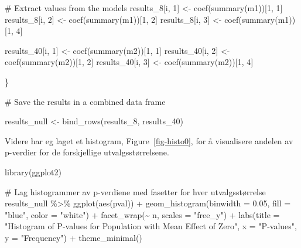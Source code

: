 \documentclass[
  letterpaper,
  DIV=11,
  numbers=noendperiod]{scrreprt}
\newenvironment{Shaded}{\begin{snugshade}}{\end{snugshade}}
\newcommand{\AttributeTok}[1]{\textcolor[rgb]{0.40,0.45,0.13}{#1}}
\newcommand{\CommentTok}[1]{\textcolor[rgb]{0.37,0.37,0.37}{#1}}
\newcommand{\DecValTok}[1]{\textcolor[rgb]{0.68,0.00,0.00}{#1}}
\newcommand{\FloatTok}[1]{\textcolor[rgb]{0.68,0.00,0.00}{#1}}
\newcommand{\FunctionTok}[1]{\textcolor[rgb]{0.28,0.35,0.67}{#1}}
\newcommand{\NormalTok}[1]{\textcolor[rgb]{0.00,0.23,0.31}{#1}}
\newcommand{\OtherTok}[1]{\textcolor[rgb]{0.00,0.23,0.31}{#1}}
\newcommand{\SpecialCharTok}[1]{\textcolor[rgb]{0.37,0.37,0.37}{#1}}
\newcommand{\StringTok}[1]{\textcolor[rgb]{0.13,0.47,0.30}{#1}}
\begin{document}
\begin{Shaded}
\begin{Highlighting}[]
  \CommentTok{\# Extract values from the models}
\NormalTok{  results\_8[i, }\DecValTok{1}\NormalTok{] }\OtherTok{\textless{}{-}} \FunctionTok{coef}\NormalTok{(}\FunctionTok{summary}\NormalTok{(m1))[}\DecValTok{1}\NormalTok{, }\DecValTok{1}\NormalTok{]}
\NormalTok{  results\_8[i, }\DecValTok{2}\NormalTok{] }\OtherTok{\textless{}{-}} \FunctionTok{coef}\NormalTok{(}\FunctionTok{summary}\NormalTok{(m1))[}\DecValTok{1}\NormalTok{, }\DecValTok{2}\NormalTok{]}
\NormalTok{  results\_8[i, }\DecValTok{3}\NormalTok{] }\OtherTok{\textless{}{-}} \FunctionTok{coef}\NormalTok{(}\FunctionTok{summary}\NormalTok{(m1))[}\DecValTok{1}\NormalTok{, }\DecValTok{4}\NormalTok{]}

\NormalTok{  results\_40[i, }\DecValTok{1}\NormalTok{] }\OtherTok{\textless{}{-}} \FunctionTok{coef}\NormalTok{(}\FunctionTok{summary}\NormalTok{(m2))[}\DecValTok{1}\NormalTok{, }\DecValTok{1}\NormalTok{]}
\NormalTok{  results\_40[i, }\DecValTok{2}\NormalTok{] }\OtherTok{\textless{}{-}} \FunctionTok{coef}\NormalTok{(}\FunctionTok{summary}\NormalTok{(m2))[}\DecValTok{1}\NormalTok{, }\DecValTok{2}\NormalTok{]}
\NormalTok{  results\_40[i, }\DecValTok{3}\NormalTok{] }\OtherTok{\textless{}{-}} \FunctionTok{coef}\NormalTok{(}\FunctionTok{summary}\NormalTok{(m2))[}\DecValTok{1}\NormalTok{, }\DecValTok{4}\NormalTok{]}
  
  
\NormalTok{\}}


\CommentTok{\# Save the results in a combined data frame}

\NormalTok{results\_null }\OtherTok{\textless{}{-}} \FunctionTok{bind\_rows}\NormalTok{(results\_8, results\_40)}
\end{Highlighting}
\end{Shaded}

Videre har eg laget et histogram, Figure~\ref{fig-histo0}, for å
visualisere andelen av p-verdier for de forskjellige utvalgsstørrelsene.

\begin{Shaded}
\begin{Highlighting}[]
\FunctionTok{library}\NormalTok{(ggplot2)}

\CommentTok{\# Lag histogrammer av p{-}verdiene med fasetter for hver utvalgsstørrelse}
\NormalTok{results\_null }\SpecialCharTok{\%\textgreater{}\%}
  \FunctionTok{ggplot}\NormalTok{(}\FunctionTok{aes}\NormalTok{(pval)) }\SpecialCharTok{+} 
  \FunctionTok{geom\_histogram}\NormalTok{(}\AttributeTok{binwidth =} \FloatTok{0.05}\NormalTok{, }\AttributeTok{fill =} \StringTok{"blue"}\NormalTok{, }\AttributeTok{color =} \StringTok{"white"}\NormalTok{) }\SpecialCharTok{+} 
  \FunctionTok{facet\_wrap}\NormalTok{(}\SpecialCharTok{\textasciitilde{}}\NormalTok{ n, }\AttributeTok{scales =} \StringTok{"free\_y"}\NormalTok{) }\SpecialCharTok{+}
  \FunctionTok{labs}\NormalTok{(}\AttributeTok{title =} \StringTok{"Histogram of P{-}values for Population with Mean Effect of Zero"}\NormalTok{,}
       \AttributeTok{x =} \StringTok{"P{-}values"}\NormalTok{,}
       \AttributeTok{y =} \StringTok{"Frequency"}\NormalTok{) }\SpecialCharTok{+}
  \FunctionTok{theme\_minimal}\NormalTok{()}
\end{Highlighting}
\end{Shaded}
\end{document}
